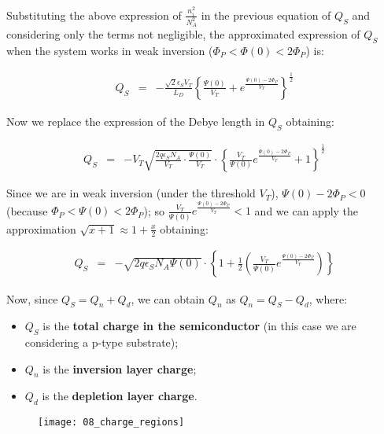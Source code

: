 \documentclass[a4paper, 12pt, twoside, openright]{report}
\begin{document}
Substituting the above expression of $\frac{n_{i}^2}{N_{A}^2}$ in the previous equation of $Q_{S}$ and considering only the terms not negligible, the approximated expression of $Q_{S}$ when the system works in weak inversion ($\Phi_P < \Phi(0) < 2\Phi_P$) is:

   \begin{eqnarray*}
      Q_S&=&-\displaystyle\frac{\sqrt{2}\epsilon_S V_T}{L_D}
            \left\{\frac{\Psi(0)}{V_T} + 
          e^{\displaystyle \frac{\Psi(0)-2\Phi_P}{V_T}}\right\}^{\frac{1}{2}}
    \end{eqnarray*}

Now we replace the expression of the Debye length in $Q_{S}$ obtaining:

    \begin{eqnarray*}
      Q_S&=&-V_T \sqrt{\frac {2q \epsilon_S N_A}{V_T} \cdot \frac {\Psi(0)}{V_T}}\cdot \left\{ {\frac{V_T}{\Psi(0)} e^{\displaystyle \frac{\Psi(0)-2\Phi_P}{V_T}}} +1 \right\}^{\frac{1}{2}}
     \end{eqnarray*}

Since we are in weak inversion (under the threshold $V_{T}$), $\Psi(0) - 2\Phi_P < 0$ (because $\Phi_P < \Psi(0) < 2\Phi_P$); so $\frac{V_T}{\Psi(0)}e^{\frac{\Psi(0) - 2\Phi_P}{V_T}} < 1$ and we can apply the approximation $\sqrt{x+1} \approx 1+ \frac{x}{2}$ obtaining:

 \begin{eqnarray*}
      Q_S &=&-\sqrt{2q \epsilon_S N_A \Psi(0)}\cdot \left\{ 1 +\frac{1}{2}\left( \frac{V_T}{\Psi(0)} e^{\displaystyle\frac{\Psi(0)-2\Phi_P}{V_T}}\right) \right\}
  \end{eqnarray*}

Now, since $Q_S = Q_n + Q_d$, we can obtain $Q_{n}$ as $Q_n = Q_S - Q_d$, where:

\begin{itemize}
\item $Q_{S}$ is the \textbf{total charge in the semiconductor} (in this case we are considering a p-type substrate);
\item $Q_{n}$ is the \textbf{inversion layer charge};
\item $Q_{d}$ is the \textbf{depletion layer charge}.
\end{itemize}


	\begin{figure}[H]
	\centering
	\texttt{[image: 08\_charge\_regions]}
	\caption{}
	\label{}
	\end{figure}
\end{document}
